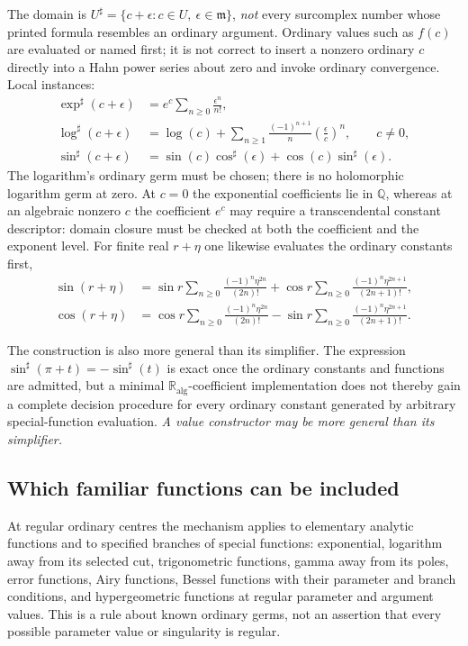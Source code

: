 \documentclass[11pt,letterpaper]{article}
\numberwithin{equation}{section}
\theoremstyle{definition}
\theoremstyle{remark}
\newcommand{\Q}{\mathbb Q}
\newcommand{\RA}{\mathbb R_{\mathrm{alg}}}
\newcommand{\mm}{\mathfrak m}
\newcommand{\sh}{^{\sharp}}
\begin{document}
The domain is $U\sh=\{c+\epsilon:c\in U,\ \epsilon\in\mm\}$, \emph{not} every
surcomplex number whose printed formula resembles an ordinary argument. Ordinary
values such as $f(c)$ are evaluated or named first; it is not correct to insert
a nonzero ordinary $c$ directly into a Hahn power series about zero and invoke
ordinary convergence. Local instances:
\begin{align}
 \exp\sh(c+\epsilon)&=e^c\sum_{n\ge0}\frac{\epsilon^n}{n!},
 \label{cas:eq-localexp}\\
 \log\sh(c+\epsilon)&=\log(c)+\sum_{n\ge1}\frac{(-1)^{n+1}}{n}
 \left(\frac{\epsilon}{c}\right)^{\!n},\qquad c\ne0,
 \label{cas:eq-locallog}\\
 \sin\sh(c+\epsilon)&=\sin(c)\cos\sh(\epsilon)+\cos(c)\sin\sh(\epsilon).
 \label{cas:eq-localsin}
\end{align}
The logarithm's ordinary germ must be chosen; there is no holomorphic logarithm
germ at zero. At $c=0$ the exponential coefficients lie in $\Q$, whereas at an
algebraic nonzero $c$ the coefficient $e^c$ may require a transcendental
constant descriptor: domain closure must be checked at both the coefficient and
the exponent level. For finite real $r+\eta$ one likewise evaluates the ordinary
constants first,
\begin{align}
 \sin(r+\eta)&=\sin r\sum_{n\ge0}\frac{(-1)^n\eta^{2n}}{(2n)!}
 +\cos r\sum_{n\ge0}\frac{(-1)^n\eta^{2n+1}}{(2n+1)!},
 \label{cas:eq-sinfinite}\\
 \cos(r+\eta)&=\cos r\sum_{n\ge0}\frac{(-1)^n\eta^{2n}}{(2n)!}
 -\sin r\sum_{n\ge0}\frac{(-1)^n\eta^{2n+1}}{(2n+1)!}.
 \label{cas:eq-cosfinite}
\end{align}

The construction is also more general than its simplifier. The expression
$\sin\sh(\pi+t)=-\sin\sh(t)$ is exact once the ordinary constants and functions
are admitted, but a minimal $\RA$-coefficient implementation does not thereby
gain a complete decision procedure for every ordinary constant generated by
arbitrary special-function evaluation. \emph{A value constructor may be more
general than its simplifier.}

\subsection{Which familiar functions can be included}
\label{cas:sub-admissible}
At regular ordinary centres the mechanism applies to elementary analytic
functions and to specified branches of special functions: exponential,
logarithm away from its selected cut, trigonometric functions, gamma away from
its poles, error functions, Airy functions, Bessel functions with their
parameter and branch conditions, and hypergeometric functions at regular
parameter and argument values. This is a rule about known ordinary germs, not an
assertion that every possible parameter value or singularity is regular.
\end{document}
